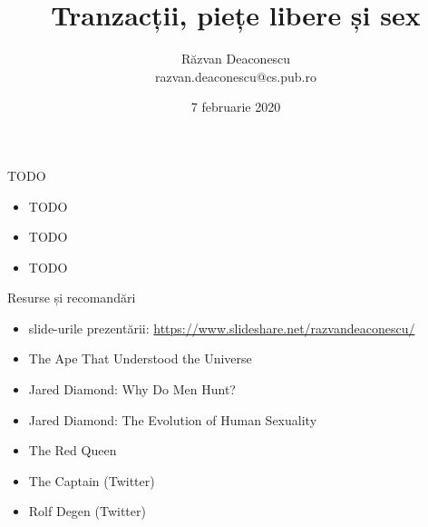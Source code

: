 \documentclass{simple}
\title[Tranzacții, piețe libere și sex]{Tranzacții, piețe libere și sex}
\institute{Unicorns, Fairies, Retards and Assholes Trip}
\author[Răzvan Deaconescu]{Răzvan Deaconescu \\
razvan.deaconescu@cs.pub.ro}
\date{7 februarie 2020}
\begin{document}
\frame{\titlepage}

\begin{frame}{TODO}
  \begin{itemize}
    \item TODO
    \item TODO
    \item TODO
  \end{itemize}
\end{frame}

%
%
%

\begin{frame}{Resurse și recomandări}
  \begin{itemize}
    \item slide-urile prezentării: \url{https://www.slideshare.net/razvandeaconescu/}
    \item The Ape That Understood the Universe
    \item Jared Diamond: Why Do Men Hunt?
    \item Jared Diamond: The Evolution of Human Sexuality
    \item The Red Queen
    \item The Captain (Twitter)
    \item Rolf Degen (Twitter)
  \end{itemize}
\end{frame}
\end{document}
